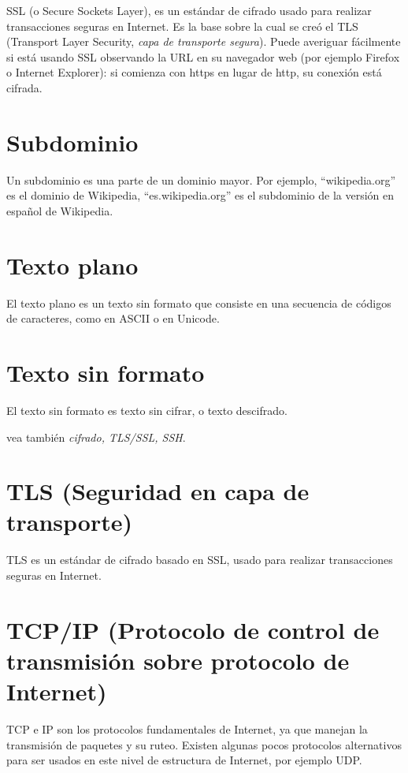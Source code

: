 \documentclass[10pt,a5paper,twoside,,]{book}
\begin{document}
SSL (o Secure Sockets Layer), es un estándar de cifrado usado para
realizar transacciones seguras en Internet. Es la base sobre la cual se
creó el TLS (Transport Layer Security, \emph{capa de transporte
segura}). Puede averiguar fácilmente si está usando SSL observando la
URL en su navegador web (por ejemplo Firefox o Internet Explorer): si
comienza con https en lugar de http, su conexión está cifrada.

\section{Subdominio}\label{subdominio}

Un subdominio es una parte de un dominio mayor. Por ejemplo,
``wikipedia.org'' es el dominio de Wikipedia, ``es.wikipedia.org'' es el
subdominio de la versión en español de Wikipedia.

\section{Texto plano}\label{texto-plano}

El texto plano es un texto sin formato que consiste en una secuencia de
códigos de caracteres, como en ASCII o en Unicode.

\section{Texto sin formato}\label{texto-sin-formato}

El texto sin formato es texto sin cifrar, o texto descifrado.

vea también \emph{cifrado, TLS/SSL, SSH}.

\section{TLS (Seguridad en capa de
transporte)}\label{tls-seguridad-en-capa-de-transporte}

TLS es un estándar de cifrado basado en SSL, usado para realizar
transacciones seguras en Internet.

\section{TCP/IP (Protocolo de control de transmisión sobre protocolo de
Internet)}\label{tcpip-protocolo-de-control-de-transmisiuxf3n-sobre-protocolo-de-internet}

TCP e IP son los protocolos fundamentales de Internet, ya que manejan la
transmisión de paquetes y su ruteo. Existen algunas pocos protocolos
alternativos para ser usados en este nivel de estructura de Internet,
por ejemplo UDP.
\end{document}
